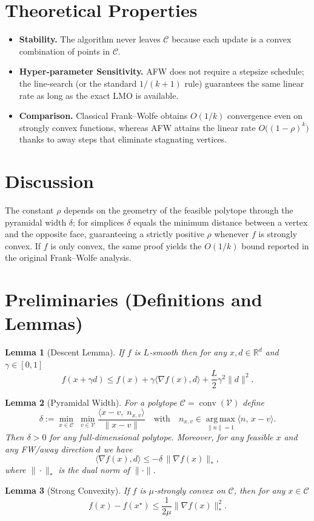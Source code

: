 \documentclass{article}
\newtheorem{lemma}{Lemma}
\newcommand{\conv}{\operatorname{conv}}
\newcommand{\argmax}{\operatorname*{arg\,max}}
\begin{document}
\section*{Theoretical Properties}
\begin{itemize}
\item \textbf{Stability.} The algorithm never leaves $\mathcal C$ because each
update is a convex combination of points in $\mathcal C$.
\item \textbf{Hyper‑parameter Sensitivity.} AFW does not require a stepsize
schedule; the line‑search (or the standard $1/(k+1)$ rule) guarantees the
same linear rate as long as the exact LMO is available.
\item \textbf{Comparison.} Classical Frank–Wolfe obtains $O(1/k)$ convergence
even on strongly convex functions, whereas AFW attains the linear rate
$O\bigl((1-\rho)^k\bigr)$ thanks to away steps that eliminate
stagnating vertices.
\end{itemize}

\section*{Discussion}
The constant $\rho$ depends on the geometry of the feasible polytope
through the pyramidal width $\delta$; for simplices $\delta$ equals the
minimum distance between a vertex and the opposite face, guaranteeing a
strictly positive $\rho$ whenever $f$ is strongly convex. If $f$ is only
convex, the same proof yields the $O(1/k)$ bound reported in the original
Frank–Wolfe analysis.

\section*{Preliminaries (Definitions and Lemmas)}
\begin{lemma}[Descent Lemma]\label{lem:descent}
If $f$ is $L$‑smooth then for any $x,d\in\mathbb R^d$ and $\gamma\in[0,1]$
\[
f(x+\gamma d)\le f(x)+\gamma\langle\nabla f(x),d\rangle
+\frac{L}{2}\gamma^{2}\|d\|^{2}.
\tag{L1}
\]
\end{lemma}
\begin{lemma}[Pyramidal Width]\label{lem:pyramid}
For a polytope $\mathcal C=\conv(\mathcal V)$ define
\[
\delta:=\min_{x\in\mathcal C}\;\min_{v\in\mathcal V}
\frac{\langle x-v,\; n_{x,v}\rangle}{\|x-v\|}
\quad\text{with}\quad
n_{x,v}\in\argmax_{\|n\|=1}\langle n,\,x-v\rangle .
\]
Then $\delta>0$ for any full‑dimensional polytope. Moreover,
for any feasible $x$ and any FW/away direction $d$ we have
\[
\langle\nabla f(x),d\rangle\le -\delta\,\|\nabla f(x)\|_{*},
\tag{L2}
\]
where $\|\cdot\|_{*}$ is the dual norm of $\|\cdot\|$.
\end{lemma}
\begin{lemma}[Strong Convexity]\label{lem:strong}
If $f$ is $\mu$‑strongly convex on $\mathcal C$, then for any $x\in\mathcal C$
\[
f(x)-f(x^{\star})\le \frac{1}{2\mu}\|\nabla f(x)\|_{*}^{2}.
\tag{L3}
\]
\end{lemma}
\end{document}
